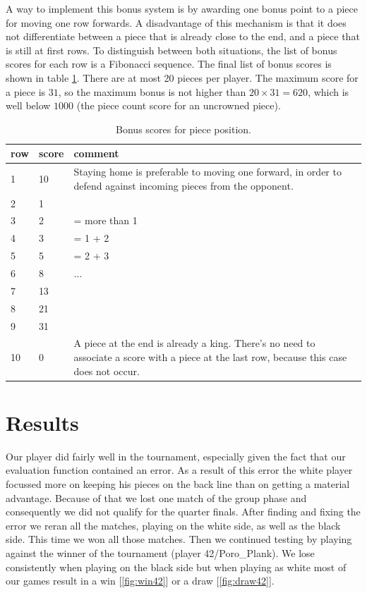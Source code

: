 \documentclass[11pt,a4paper]{article}
\begin{document}
A way to implement this bonus system is by awarding one bonus point to a piece for moving one row forwards. A disadvantage of this mechanism is that it does not differentiate between a piece that is already close to the end, and a piece that is still at first rows. To distinguish between both situations, the list of bonus scores for each row is a Fibonacci sequence. The final list of bonus scores is shown in table \ref{table:bonusscore}. There are at most 20 pieces per player. The maximum score for a piece is $31$, so the maximum bonus is not higher than $20\times 31 = 620$, which is well below $1000$ (the piece count score for an uncrowned piece).

\begin{table}[ht]
\begin{tabularx}{\linewidth}{l|l|X}
row & score & comment \\
\hline
1 & 10 & Staying home is preferable to moving one forward, in order to defend against incoming pieces from the opponent. \\
2 & 1 & \\
3 & 2 & = more than 1 \\
4 & 3 & = 1 + 2\\
5 & 5 & = 2 + 3\\
6 & 8 & $\dots$\\
7 & 13 & \\
8 & 21 & \\
9 & 31 & \\
10 & 0 & A piece at the end is already a king. There's no need to associate a score with a piece at the last row, because this case does not occur. \\
\end{tabularx}
\caption{Bonus scores for piece position.}\label{table:bonusscore}
\end{table}

\section{Results}
Our player did fairly well in the tournament, especially given the fact that our evaluation function contained an error. As a result of this error the white player focussed more on keeping his pieces on the back line than on getting a material advantage. Because of that we lost one match of the group phase and consequently we did not qualify for the quarter finals. After finding and fixing the error we reran all the matches, playing on the white side, as well as the black side. This time we won all those matches. Then we continued testing by playing against the winner of the tournament (player 42/Poro\_Plank). We lose consistently when playing on the black side but when playing as white most of our games result in a win [\ref{fig:win42}] or a draw [\ref{fig:draw42}].
\end{document}
